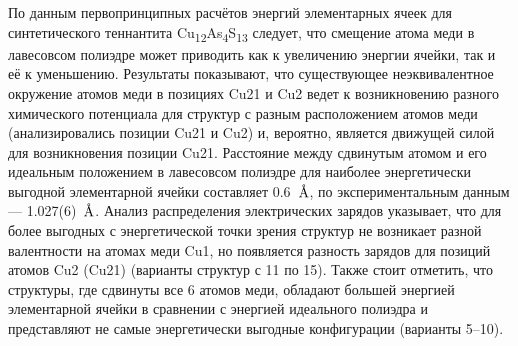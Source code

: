 По данным первопринципных расчётов энергий элементарных ячеек для синтетического теннантита Cu\textsubscript{12}As\textsubscript{4}S\textsubscript{13} следует,  что смещение атома меди в лавесовсом полиэдре может приводить как к увеличению энергии ячейки, так и её к уменьшению.
Результаты показывают, что существующее неэквивалентное  окружение атомов меди в позициях Cu21 и Cu2 ведет к возникновению разного химического потенциала для структур с разным расположением атомов меди (анализировались позиции Cu21 и Cu2) и, вероятно, является движущей силой для возникновения позиции Cu21. Расстояние между сдвинутым атомом и его идеальным положением в лавесовсом полиэдре для наиболее энергетически выгодной элементарной ячейки составляет 0.6~$\mbox{\normalfont\AA}$, по экспериментальным данным --- 1.027(6)~$\mbox{\normalfont\AA}$.
Анализ распределения электрических зарядов указывает, что для более выгодных с энергетической точки зрения структур не возникает разной валентности на атомах меди Cu1,
но появляется разность зарядов для позиций атомов Cu2 (Cu21) (варианты структур с 11 по 15). Также стоит отметить, что структуры, где сдвинуты все 6 атомов меди, обладают большей энергией элементарной ячейки в сравнении с энергией идеального полиэдра и представляют не самые энергетически выгодные конфигурации  (варианты 5--10).









\clearpage

\newpage
